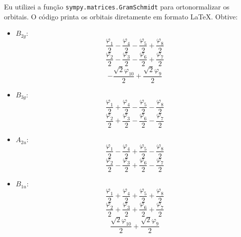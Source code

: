 \documentclass[a4paper,10pt]{article}
\newcommand{\python}[1]{\texttt{#1}}
\begin{document}
Eu utilizei a função \python{sympy.matrices.GramSchmidt} para ortonormalizar os orbitais. O código printa os orbitais diretamente em formato \LaTeX. Obtive:

\begin{itemize}
\item $B_{2g}$:
$$
\frac{\varphi_{1}}{2} - \frac{\varphi_{4}}{2} - \frac{\varphi_{5}}{2} + \frac{\varphi_{8}}{2}
$$
$$
\frac{\varphi_{2}}{2} - \frac{\varphi_{3}}{2} - \frac{\varphi_{6}}{2} + \frac{\varphi_{7}}{2}
$$
$$
- \frac{\sqrt{2} \varphi_{10}}{2} + \frac{\sqrt{2} \varphi_{9}}{2}
$$

\item $B_{3g}$:
$$
\frac{\varphi_{1}}{2} + \frac{\varphi_{4}}{2} - \frac{\varphi_{5}}{2} - \frac{\varphi_{8}}{2}
$$
$$
\frac{\varphi_{2}}{2} + \frac{\varphi_{3}}{2} - \frac{\varphi_{6}}{2} - \frac{\varphi_{7}}{2}
$$

\item $A_{2u}$:
$$
\frac{\varphi_{1}}{2} - \frac{\varphi_{4}}{2} + \frac{\varphi_{5}}{2} - \frac{\varphi_{8}}{2}
$$
$$
\frac{\varphi_{2}}{2} - \frac{\varphi_{3}}{2} + \frac{\varphi_{6}}{2} - \frac{\varphi_{7}}{2}
$$

\item $B_{1u}$:
$$
\frac{\varphi_{1}}{2} + \frac{\varphi_{4}}{2} + \frac{\varphi_{5}}{2} + \frac{\varphi_{8}}{2}
$$
$$
\frac{\varphi_{2}}{2} + \frac{\varphi_{3}}{2} + \frac{\varphi_{6}}{2} + \frac{\varphi_{7}}{2}
$$
$$
\frac{\sqrt{2} \varphi_{10}}{2} + \frac{\sqrt{2} \varphi_{9}}{2}
$$
\end{itemize}
\end{document}
